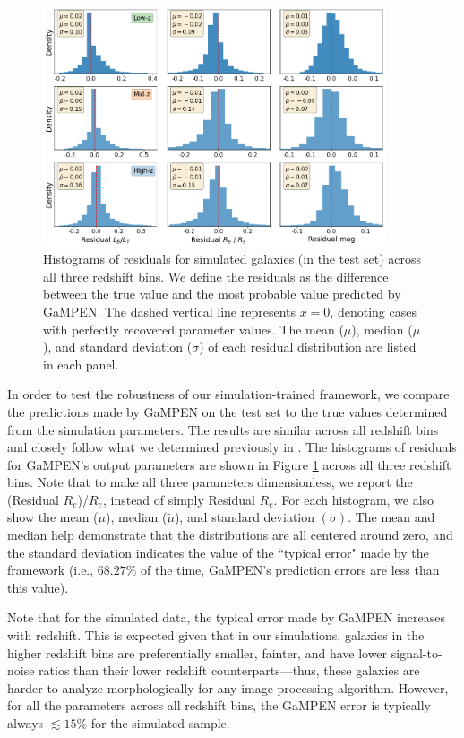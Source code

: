 \documentclass[linenumbers,twocolumn,twocolappendix]{aastex631}
\newcommand\gampen{GaMPEN}
\begin{document}
\begin{CJK*}{UTF8}{gbsn}
\begin{figure}[htb]
    \centering
    \includegraphics[width = 0.9\textwidth]{err_hist_sim_all_z.png}
    \caption{Histograms of residuals for simulated galaxies (in the test set) across all three redshift bins. We define the residuals as the difference between the true value and the most probable value predicted by \gampen{}. The dashed vertical line represents $x = 0$, denoting cases with perfectly recovered parameter values. 
    The mean ($\mu$), median ($\tilde{\mu}$), and standard deviation ($\sigma$) of each residual distribution are listed in each panel.}
    \label{fig:resi_sim_all_z}
\end{figure}

In order to test the robustness of our simulation-trained framework, we compare the predictions made by \gampen{} on the test set to the true values determined from the simulation parameters. The results are similar across all redshift bins and closely follow what we determined previously in \citet{gampen_software_paper}. The histograms of residuals for \gampen{}'s output parameters are shown in Figure \ref{fig:resi_sim_all_z} across all three redshift bins. Note that to make all three parameters dimensionless, we report the (Residual $R_e$)/$R_e$, instead of simply Residual $R_e$. For each histogram, we also show the mean ($\mu$), median ($\tilde{\mu}$), and standard deviation $(\sigma)$. The mean and median help demonstrate that the distributions are all centered around zero, and the standard deviation indicates the value of the ``typical error" made by the framework (i.e., $68.27\%$ of the time, \gampen{}'s prediction errors are less than this value).

Note that for the simulated data, the typical error made by \gampen{} increases with redshift. This is expected given that in our simulations, galaxies in the higher redshift bins are preferentially smaller, fainter, and have lower signal-to-noise ratios than their lower redshift counterparts---thus, these galaxies are harder to analyze morphologically for any image processing algorithm. However, for all the parameters across all redshift bins, the \gampen{} error is typically always $\lesssim 15\%$ for the simulated sample.


\end{CJK*}
\end{document}
